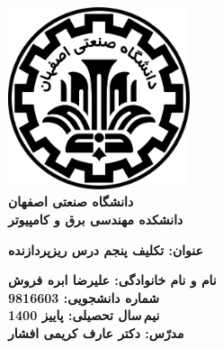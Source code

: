 \begin{titlepage}
\begin{center}
\includegraphics[width=0.4\textwidth]{figures/IUT Logo.png}\\
        
\LARGE
\textbf{دانشگاه صنعتی اصفهان}\\
\textbf{دانشکده مهندسی برق و کامپیوتر}\\
        
\vfill
        
\huge
\textbf{عنوان: تکلیف پنجم درس ریزپردازنده}\\
        
\vfill
        
\LARGE
\textbf{نام و نام خانوادگی: علیرضا ابره فروش}\\
\textbf{شماره دانشجویی: 9816603}\\
\textbf{نیم\,سال تحصیلی: پاییز 1400}\\
\textbf{مدرّس: دکتر عارف کریمی افشار}\\
\end{center}
\end{titlepage}
